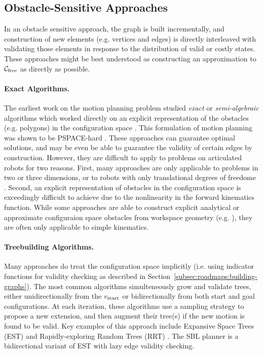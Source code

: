 \subsection{Obstacle-Sensitive Approaches}
\label{subsec:roadmaps:sensitive}

In an obstacle sensitive approach,
the graph is built incrementally,
and construction of new elements (e.g. vertices and edges)
is directly interleaved with validating those elements
in response to the distribution of valid or costly states.
These approaches might be best understood
as constructing an approximation to $\mathcal{C}_{\mbox{\scriptsize free}}$
as directly as possible.

\paragraph{Exact Algorithms.}
The earliest work on the motion planning problem studied
\emph{exact} or \emph{semi-algebraic}
algorithms which worked directly on an explicit representation
of the obstacles (e.g. polygons) in the configuration space
\citep{lozanoperez1983cspace}.
This formulation of motion planning was shown to be
PSPACE-hard \citep{reif1979moverscomplexity,canny1988complexitymotionplanning}.
These approaches can guarantee optimal solutions,
and may be even be able to guarantee the validity of certain edges
by construction.
However,
they are difficult to apply to problems on articulated
robots for two reasons.
First, many approaches are only applicable to problems
in two or three dimensions,
or to robots with only translational degrees of freedome
\citep{kavraki1995cspacefft}.
Second, an explicit representation of obstacles in the
configuration space is exceedingly difficult to achieve due to the
nonlinearity in the forward kinematics function.
While some approaches are able to construct explicit
analytical or approximate configuraion space obstacles from
workspace geometry (e.g. \citep{newmanbranicky1991cspacetransforms}),
they are often only applicable to simple kinematics.

\paragraph{Treebuilding Algorithms.}
Many approaches do treat the configuration space implicitly
(i.e. using indicator functions for validity checking as described
in Section~\ref{subsec:roadmaps:building-graphs}).
The most common algorithms simulteneously grow and validate trees,
either unidirectionally from the $v_{\mbox{\scriptsize start}}$ or bidirectionally
from both start and goal configurations.
At each iteration,
these algorithms use a sampling strategy to propose a new extension,
and then augment their tree(s) if the new motion is found to be valid.
Key examples of this approach include
Expansive Space Trees (EST) \citep{hsu1997expansive}
and Rapidly-exploring Random Trees (RRT)
\citep{lavalle1998rrt, kuffner2000rrtconnect}.
The SBL planner \citep{sanchezante2001sbl}
is a bidirectional variant of EST with lazy edge validity checking.

